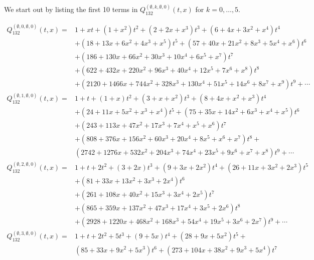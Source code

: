 \documentclass[
final,nomarks
]{dmtcs-episciences}
\newcommand{\Qmm}[1]{Q_{132}^{(#1)}(t,x)}
\begin{document}
We start out by listing the first 10 terms in \begin{math}\Qmm{\emptyset,k,\emptyset,0}\end{math} for 
\begin{math}k = 0, \ldots, 5\end{math}. 

\begin{align}
\Qmm{\emptyset,0,\emptyset,0}=&
1+x t+\left(1+x^2\right) t^2+\left(2+2 x+x^3\right) t^3+\left(6+4 x+3 x^2+x^4\right) t^4\nonumber\\\nonumber
&+\left(18+13 x+6 x^2+4 x^3+x^5\right) t^5+\left(57+40
x+21 x^2+8 x^3+5 x^4+x^6\right) t^6\\\nonumber
&+\left(186+130 x+66 x^2+30 x^3+10 x^4+6 x^5+x^7\right) t^7\\\nonumber
&+\left(622+432 x+220 x^2+96 x^3+40 x^4+12 x^5+7 x^6+x^8\right)
t^8\\
& +\left(2120+1466 x+744 x^2+328 x^3+130 x^4+51 x^5+14 x^6+8 x^7+x^9\right) t^9+ \cdots 
\\
\Qmm{\emptyset,1,\emptyset,0}=&1+t+(1+x) t^2+\left(3+x+x^2\right) t^3+\left(8+4 x+x^2+x^3\right) t^4 \nonumber\\\nonumber
&+\left(24+11 x+5 x^2+x^3+x^4\right) t^5 +\left(75+35 x+14 x^2+6 x^3+x^4+x^5\right)
t^6\\\nonumber
&+\left(243+113 x+47 x^2+17 x^3+7 x^4+x^5+x^6\right) t^7\\\nonumber
&+\left(808+376 x+156 x^2+60 x^3+20 x^4+8 x^5+x^6+x^7\right) t^8+\\
& \left(2742+1276 x+532 x^2+204
x^3+74 x^4+23 x^5+9 x^6+x^7+x^8\right) t^9+ \cdots 
\\
\Qmm{\emptyset,2,\emptyset,0}=& 1+t+2 t^2+(3+2 x) t^3+\left(9+3 x+2 x^2\right) t^4+\left(26+11 x+3 x^2+2 x^3\right) t^5\nonumber\\\nonumber
&+\left(81+33 x+13 x^2+3 x^3+2 x^4\right) t^6\\\nonumber
&+\left(261+108
x+40 x^2+15 x^3+3 x^4+2 x^5\right) t^7\\\nonumber
&+\left(865+359 x+137 x^2+47 x^3+17 x^4+3 x^5+2 x^6\right) t^8\\
&+\left(2928+1220 x+468 x^2+168 x^3+54 x^4+19 x^5+3
x^6+2 x^7\right) t^9+\cdots
\\
\Qmm{\emptyset,3,\emptyset,0}=& 1+t+2 t^2+5 t^3+(9+5 x) t^4+\left(28+9 x+5 x^2\right) t^5+\nonumber\\\nonumber
&\left(85+33 x+9 x^2+5 x^3\right) t^6+\left(273+104 x+38 x^2+9 x^3+5 x^4\right)
t^7\\\nonumber

\end{align}
\end{document}
